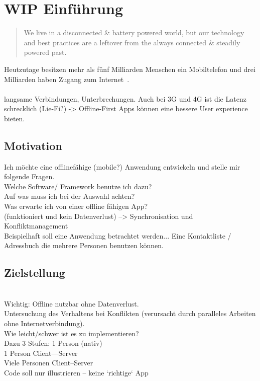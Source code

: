 \chapter{\label{chap:einleitung}WIP Einführung}
\begin{quote}
	We live in a disconnected \& battery powered world, but our technology and best practices are a leftover from the always connected \& steadily powered past.
	\cite{offlinefirst}
\end{quote}

Heutzutage besitzen mehr als fünf Milliarden Menschen ein Mobiltelefon und drei Milliarden haben Zugang zum Internet~\cite{dev-report}.\\\\
langsame Verbindungen, Unterbrechungen. Auch bei 3G und 4G ist die Latenz schrecklich (Lie-Fi?) -> Offline-First Apps können eine bessere User experience bieten.

\section{Motivation}
Ich möchte eine offlinefähige (mobile?) Anwendung entwickeln und stelle mir folgende Fragen. \\
Welche Software/ Framework benutze ich dazu?\\
Auf was muss ich bei der Auswahl achten?\\
Was erwarte ich von einer offline fähigen App?\\
(funktioniert und kein Datenverlust) --> Synchronisation und Konfliktmanagement\\
Beispielhaft soll eine Anwendung betrachtet werden... Eine Kontaktliste / Adressbuch die mehrere Personen benutzen können.\\
\section{Zielstellung}
\\
Wichtig: Offline nutzbar ohne Datenverlust.\\
Untersuchung des Verhaltens bei  Konflikten (verursacht durch paralleles Arbeiten ohne Internetverbindung).\\
Wie leicht/schwer ist es zu implementieren?
\\
Dazu 3 Stufen: 1 Person (nativ)\\
1 Person Client---Server\\
Viele Personen Client--Server\\
Code soll nur illustrieren -- keine `richtige` App
